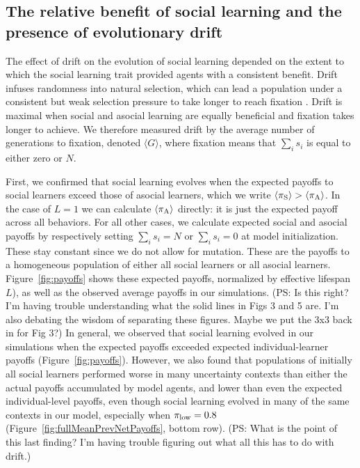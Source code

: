 \documentclass[letterpaper,11.5pt]{scrartcl}
\newcommand{\ps}[1]{{\textcolor{mygreen} {({\tiny PS:} #1)}}}
\begin{document}
\subsection{The relative benefit of social learning and the presence of evolutionary drift}

The effect of drift on the evolution of social learning %
depended on the extent to which the social learning trait provided agents with a consistent benefit. Drift infuses randomness into natural selection, which can lead a population under a consistent but weak selection pressure to take longer to reach fixation \cite{plutynski2007drift}. Drift is maximal when social and asocial learning are equally beneficial and fixation takes longer to achieve. We therefore measured drift by the average number of generations to fixation, denoted $\langle G \rangle$, where fixation means that $\sum_i s_i$ is equal to either zero or $N$. %


First, we confirmed that social learning evolves when the expected payoffs to social
learners exceed those of asocial learners, which we write $\langle \pi_\mathrm{S} \rangle > \langle \pi_\mathrm{A} \rangle$.
In the case of $L=1$ we can calculate $\langle \pi_\mathrm{A} \rangle$ directly: it is just the expected
payoff across all behaviors. For all other cases, we calculate expected social and asocial payoffs by respectively setting
$\sum_i s_i = N$ or $\sum_i s_i = 0$ at model initialization. These stay constant since we do not allow for mutation. These are the payoffs to a homogeneous population of either all social learners or all asocial learners.  Figure~\ref{fig:payoffs} shows these expected payoffs, normalized by effective lifespan $L$), as well as the observed average payoffs in our simulations. \ps{Is this right? I'm having trouble understanding what the solid lines in Figs 3 and 5 are. I'm also debating the wisdom of separating these figures. Maybe we put the 3x3 back in for Fig 3?}
In general, we observed that social learning evolved in our simulations when the expected payoffs exceeded expected individual-learner
payoffs (Figure~\ref{fig:payoffs}). 
However, we also found that populations of initially all social learners performed worse
in many uncertainty contexts than either the actual payoffs accumulated by 
model agents, and lower than even the expected individual-level payoffs,
even though social learning evolved in many of the same contexts in our model,
especially when $\pi_{\mathrm{low}} = 0.8$ 
(Figure~\ref{fig:fullMeanPrevNetPayoffs}, bottom row). \ps{What is the point of this last finding? I'm having trouble figuring out what all this has to do with drift.}
\end{document}
